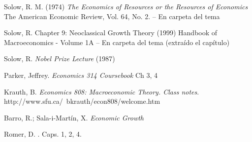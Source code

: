 \documentclass{nuevotema}
\begin{document}
Solow, R. M. (1974) \textit{The Economics of Resources or the Resources of Economics} The American Economic Review, Vol. 64, No. 2. -- En carpeta del tema

Solow, R. {Chapter 9: Neoclassical Growth Theory} (1999) Handbook of Macroeconomics - Volume 1A -- En carpeta del tema (extraído el capítulo)

Solow, R. \textit{Nobel Prize Lecture} (1987)

Parker, Jeffrey. \textit{Economics 314 Coursebook} Ch 3, 4

Krauth, B. \textit{Economics 808: Macroeconomic Theory. Class notes}. http://www.sfu.ca/~bkrauth/econ808/welcome.htm

Barro, R.; Sala-i-Martín, X. \textit{Economic Growth}

Romer, D. . Caps. 1, 2, 4.
\end{document}
